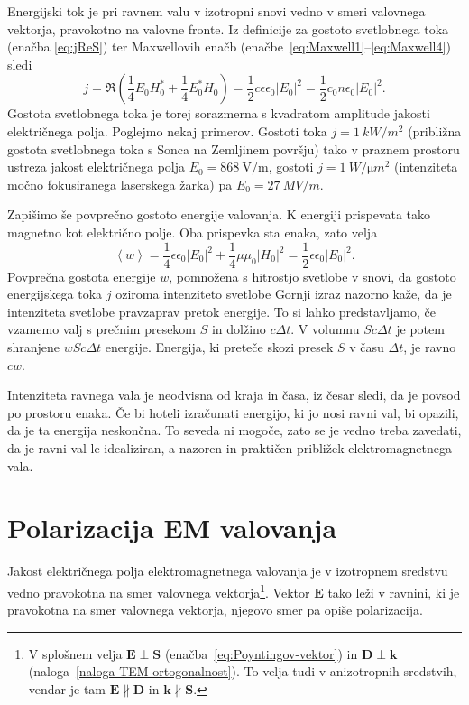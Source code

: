 Energijski tok je pri ravnem valu v izotropni snovi vedno v smeri valovnega vektorja, pravokotno
na valovne fronte. Iz definicije za gostoto svetlobnega toka (enačba \ref{eq:jReS}) 
ter Maxwellovih enačb (enačbe~\ref{eq:Maxwell1}--\ref{eq:Maxwell4}) 
sledi
\begin{equation}
j=\Re\left(\frac{1}{4}E_{0}H_{0}^{*}+\frac{1}{4}E_{0}^*H_{0}\right)=
\frac{1}{2}c\epsilon\epsilon_{0}\left|E_{0}\right|^{2}=\frac{1}{2}c_{0}n\epsilon_{0}
\left|E_{0}\right|^{2}.
\label{eq:j}
\end{equation}
Gostota svetlobnega toka je torej sorazmerna
s kvadratom amplitude jakosti električnega polja. Poglejmo nekaj primerov.
Gostoti toka $j=1~\si{kW/m^{2}}$
(približna gostota svetlobnega toka s Sonca na Zemljinem površju) tako v praznem prostoru ustreza 
jakost električnega polja $E_{0}=868~\si{\volt/\meter}$, gostoti $j=1~\si{W/\micro m^{2}}$ 
(intenziteta močno fokusiranega laserskega žarka) pa $E_{0}=27~\si{MV/m}$. 

Zapišimo še povprečno gostoto energije valovanja. 
K energiji prispevata tako magnetno kot električno polje. Oba prispevka sta enaka, zato velja
\begin{equation}
\left\langle w\right\rangle =\frac{1}{4}\epsilon\epsilon_{0}\left|E_{0}\right|^{2}+
\frac{1}{4}\mu\mu_{0}\left|H_{0}\right|^{2}=\frac{1}{2}\epsilon\epsilon_{0}\left|E_{0}\right|^{2}.
\end{equation}
Povprečna gostota energije $w$, pomnožena s hitrostjo svetlobe v
snovi, da gostoto energijskega toka $j$ oziroma intenziteto 
svetlobe
Gornji izraz nazorno kaže, da je intenziteta svetlobe pravzaprav pretok
energije. To si lahko predstavljamo, če vzamemo valj s prečnim presekom
$S$ in dolžino $c\Delta t$. V volumnu $Sc\Delta t$ je potem shranjene $wSc\Delta t$
energije. Energija, ki preteče skozi presek $S$ v času $\Delta t$,
je ravno $cw$. 

Intenziteta ravnega vala je neodvisna od kraja in časa, iz česar sledi,
da je povsod po prostoru enaka. Če bi hoteli izračunati energijo,
ki jo nosi ravni val, bi opazili, da je ta energija neskončna. To
seveda ni mogoče, zato se je vedno treba zavedati, da je ravni val
le idealiziran, a nazoren in praktičen približek elektromagnetnega
vala.

\section{Polarizacija EM valovanja}
Jakost električnega polja elektromagnetnega valovanja je v izotropnem
sredstvu vedno pravokotna na smer valovnega vektorja\footnote{V splošnem velja $\mathbf{E}\perp\mathbf{S}$ 
(enačba~\ref{eq:Poyntingov-vektor}) in $\mathbf{D}\perp\mathbf{k}$ (naloga~\ref{naloga-TEM-ortogonalnost}). 
To velja tudi v anizotropnih sredstvih, vendar je tam $\mathbf{E} \nparallel \mathbf{D}$ in 
$\mathbf k\nparallel\mathbf S$.}. Vektor $\mathbf{E}$
tako leži v ravnini, ki je pravokotna na smer valovnega vektorja, njegovo
smer pa opiše polarizacija. 

